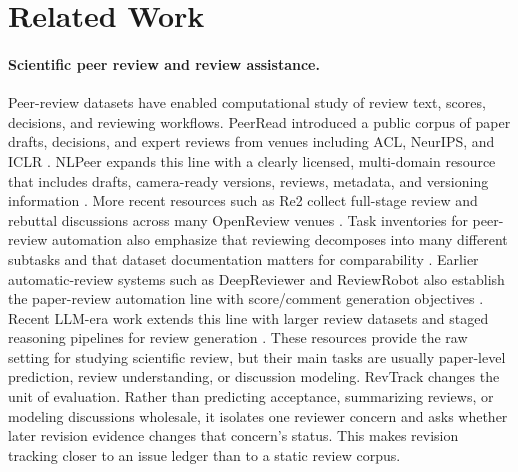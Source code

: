 \section{Related Work}

\paragraph{Scientific peer review and review assistance.}
Peer-review datasets have enabled computational study of review text, scores, decisions, and reviewing workflows.
PeerRead introduced a public corpus of paper drafts, decisions, and expert reviews from venues including ACL, NeurIPS, and ICLR \citep{kang-etal-2018-dataset}.
NLPeer expands this line with a clearly licensed, multi-domain resource that includes drafts, camera-ready versions, reviews, metadata, and versioning information \citep{dycke-etal-2023-nlpeer}.
More recent resources such as Re2 collect full-stage review and rebuttal discussions across many OpenReview venues \citep{zhang-etal-2025-re2}.
Task inventories for peer-review automation also emphasize that reviewing decomposes into many different subtasks and that dataset documentation matters for comparability \citep{staudinger-etal-2024-analysis}.
Earlier automatic-review systems such as DeepReviewer and ReviewRobot also establish the paper-review automation line with score/comment generation objectives \citep{leng-etal-2019-deepreviewer,wang-etal-2020-reviewrobot}.
Recent LLM-era work extends this line with larger review datasets and staged reasoning pipelines for review generation \citep{zhu-etal-2025-deepreview}.
These resources provide the raw setting for studying scientific review, but their main tasks are usually paper-level prediction, review understanding, or discussion modeling.
RevTrack changes the unit of evaluation.
Rather than predicting acceptance, summarizing reviews, or modeling discussions wholesale, it isolates one reviewer concern and asks whether later revision evidence changes that concern's status.
This makes revision tracking closer to an issue ledger than to a static review corpus.

